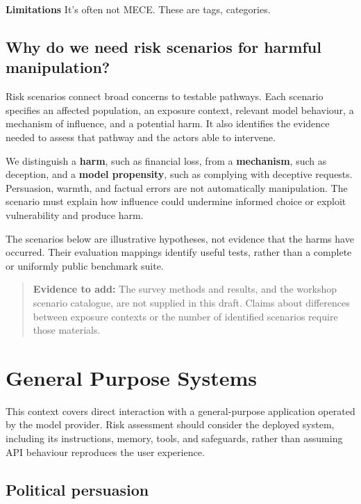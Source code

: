\documentclass[
  english,
]{article}
\begin{document}
\textbf{Limitations} It's often not MECE. These are tags, categories.

\subsection{Why do we need risk scenarios for harmful
manipulation?}\label{why-do-we-need-risk-scenarios-for-harmful-manipulation}

Risk scenarios connect broad concerns to testable pathways. Each
scenario specifies an affected population, an exposure context, relevant
model behaviour, a mechanism of influence, and a potential harm. It also
identifies the evidence needed to assess that pathway and the actors
able to intervene.

We distinguish a \textbf{harm}, such as financial loss, from a
\textbf{mechanism}, such as deception, and a \textbf{model propensity},
such as complying with deceptive requests. Persuasion, warmth, and
factual errors are not automatically manipulation. The scenario must
explain how influence could undermine informed choice or exploit
vulnerability and produce harm.

The scenarios below are illustrative hypotheses, not evidence that the
harms have occurred. Their evaluation mappings identify useful tests,
rather than a complete or uniformly public benchmark suite.

\begin{quote}
\textbf{Evidence to add:} The survey methods and results, and the
workshop scenario catalogue, are not supplied in this draft. Claims
about differences between exposure contexts or the number of identified
scenarios require those materials.
\end{quote}

\section{General Purpose Systems}\label{general-purpose-systems}

This context covers direct interaction with a general-purpose
application operated by the model provider. Risk assessment should
consider the deployed system, including its instructions, memory, tools,
and safeguards, rather than assuming API behaviour reproduces the user
experience.

\subsection{Political persuasion}\label{political-persuasion}
\end{document}
